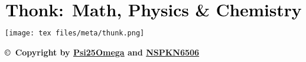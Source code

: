 \documentclass{article}
\begin{document}
\begin{align*}
    \textbf{\huge{Thonk: Math, Physics \& Chemistry}}\\
\end{align*}
\thispagestyle{empty}
\begin{center}
    \texttt{[image: tex files/meta/thunk.png]}
\end{center}
\vspace*{\fill}
\begin{center}
    \textbf{\copyright~Copyright by \href{https://github.com/Psi25Omega}{Psi25Omega} and \href{https://github.com/NSPKN6506}{NSPKN6506}}\\
\end{center}
\newpage
\tableofcontents
\thispagestyle{empty}
\newpage



\end{document}
